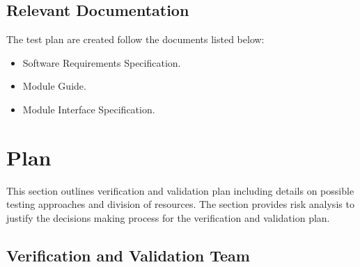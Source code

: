 \documentclass[12pt, titlepage]{article}
\begin{document}
\subsection{Relevant Documentation}
The test plan are created follow the documents listed below:
\begin{itemize}
    \item Software Requirements Specification.
    \item Module Guide.
    \item Module Interface Specification.
\end{itemize}




\section{Plan}

  
This section outlines verification and validation plan including details on possible testing approaches and division of resources. The section provides risk analysis to justify the decisions making process for the verification and validation plan.

\subsection{Verification and Validation Team}
\end{document}
